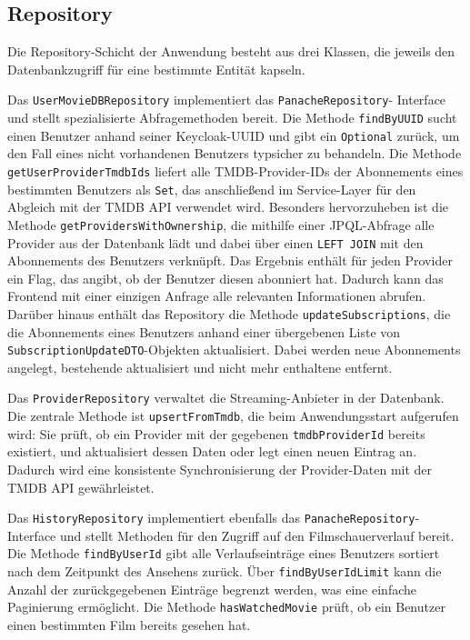 \subsection{Repository}

Die Repository-Schicht der Anwendung besteht aus drei Klassen, die jeweils
den Datenbankzugriff für eine bestimmte Entität kapseln.

Das \texttt{UserMovieDBRepository} implementiert das \texttt{PanacheRepository}-
Interface und stellt spezialisierte Abfragemethoden bereit. Die Methode
\texttt{findByUUID} sucht einen Benutzer anhand seiner Keycloak-UUID und gibt
ein \texttt{Optional} zurück, um den Fall eines nicht vorhandenen Benutzers
typsicher zu behandeln. Die Methode \texttt{getUserProviderTmdbIds} liefert
alle TMDB-Provider-IDs der Abonnements eines bestimmten Benutzers als
\texttt{Set}, das anschließend im Service-Layer für den Abgleich mit der
TMDB API verwendet wird. Besonders hervorzuheben ist die Methode
\texttt{getProvidersWithOwnership}, die mithilfe einer JPQL-Abfrage alle
Provider aus der Datenbank lädt und dabei über einen \texttt{LEFT JOIN} mit
den Abonnements des Benutzers verknüpft. Das Ergebnis enthält für jeden
Provider ein Flag, das angibt, ob der Benutzer diesen abonniert hat. Dadurch
kann das Frontend mit einer einzigen Anfrage alle relevanten Informationen
abrufen. Darüber hinaus enthält das Repository die Methode
\texttt{updateSubscriptions}, die die Abonnements eines Benutzers anhand
einer übergebenen Liste von \texttt{SubscriptionUpdateDTO}-Objekten
aktualisiert. Dabei werden neue Abonnements angelegt, bestehende
aktualisiert und nicht mehr enthaltene entfernt.

Das \texttt{ProviderRepository} verwaltet die Streaming-Anbieter in der
Datenbank. Die zentrale Methode ist \texttt{upsertFromTmdb}, die beim
Anwendungsstart aufgerufen wird: Sie prüft, ob ein Provider mit der
gegebenen \texttt{tmdbProviderId} bereits existiert, und aktualisiert
dessen Daten oder legt einen neuen Eintrag an. Dadurch wird eine konsistente
Synchronisierung der Provider-Daten mit der TMDB API gewährleistet.

Das \texttt{HistoryRepository} implementiert ebenfalls das
\texttt{PanacheRepository}-Interface und stellt Methoden für den Zugriff
auf den Filmschauerverlauf bereit. Die Methode \texttt{findByUserId} gibt
alle Verlaufseinträge eines Benutzers sortiert nach dem Zeitpunkt des
Ansehens zurück. Über \texttt{findByUserIdLimit} kann die Anzahl der
zurückgegebenen Einträge begrenzt werden, was eine einfache Paginierung
ermöglicht. Die Methode \texttt{hasWatchedMovie} prüft, ob ein Benutzer
einen bestimmten Film bereits gesehen hat.

